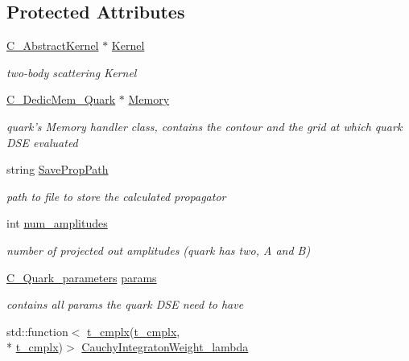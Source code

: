 \subsection*{Protected Attributes}
\begin{DoxyCompactItemize}
\item 
\hyperlink{class_c___abstract_kernel}{C\-\_\-\-Abstract\-Kernel} $\ast$ \hyperlink{class_c___quark_a825f0f4638fa87322db6af8335d6f05b}{Kernel}
\begin{DoxyCompactList}\small\item\em two-\/body scattering Kernel \end{DoxyCompactList}\item 
\hyperlink{class_c___dedic_mem___quark}{C\-\_\-\-Dedic\-Mem\-\_\-\-Quark} $\ast$ \hyperlink{class_c___quark_a9eb8b047110e9217c8dc615c9938566c}{Memory}
\begin{DoxyCompactList}\small\item\em quark's Memory handler class, contains the contour and the grid at which quark D\-S\-E evaluated \end{DoxyCompactList}\item 
string \hyperlink{class_c___quark_a6658a59e332c14057398ba12ad2eb36b}{Save\-Prop\-Path}
\begin{DoxyCompactList}\small\item\em path to file to store the calculated propagator \end{DoxyCompactList}\item 
int \hyperlink{class_c___quark_a9b47aa812f3e3abf90acfb570ae51617}{num\-\_\-amplitudes}
\begin{DoxyCompactList}\small\item\em number of projected out amplitudes (quark has two, A and B) \end{DoxyCompactList}\item 
\hyperlink{class_c___quark__parameters}{C\-\_\-\-Quark\-\_\-parameters} \hyperlink{class_c___quark_aa973622070edbcb2e2e8bf12425a4277}{params}
\begin{DoxyCompactList}\small\item\em contains all params the quark D\-S\-E need to have \end{DoxyCompactList}\item 
std\-::function$<$ \hyperlink{types_8h_aa75ae339052372f671bb263e6a272e82}{t\-\_\-cmplx}(\hyperlink{types_8h_aa75ae339052372f671bb263e6a272e82}{t\-\_\-cmplx}, \\*
\hyperlink{types_8h_aa75ae339052372f671bb263e6a272e82}{t\-\_\-cmplx})$>$ \hyperlink{class_c___quark_a1dbb8f78522434bceefdb7b42aa1c96c}{Cauchy\-Integraton\-Weight\-\_\-lambda}

\end{DoxyCompactItemize}
